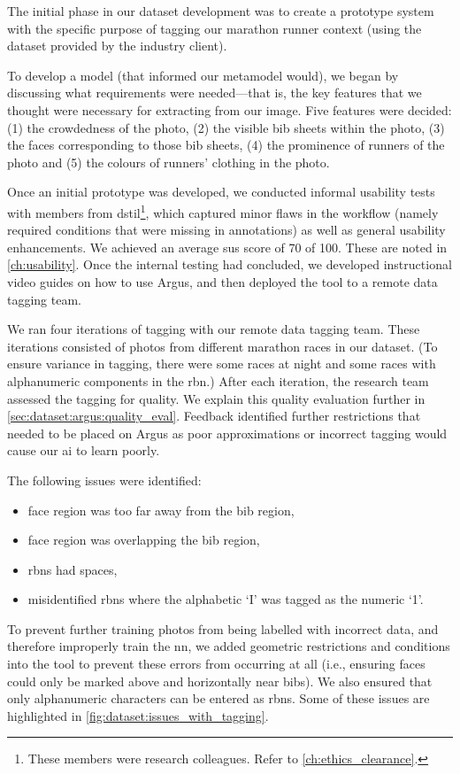 The initial phase in our dataset development was to create a prototype system with the specific purpose of tagging our marathon runner context (using the dataset provided by the industry client).


To develop a model (that informed our metamodel would), we began by discussing what requirements were needed---that is, the key features that we thought were necessary for extracting from our image. Five features were decided: (1) the crowdedness of the photo, (2) the visible bib sheets within the photo, (3) the faces corresponding to those bib sheets, (4) the prominence of runners of the photo and (5) the colours of runners' clothing in the photo.

Once an initial prototype was developed, we conducted informal usability tests with members from \gls{dstil}\footnote{These members were research colleagues. Refer to \cref{ch:ethics_clearance}.}, which captured minor flaws in the workflow (namely required conditions that were missing in annotations) as well as general usability enhancements. We achieved an average \gls{sus} score \citep{Jordan:1996wa} of 70 of 100. These are noted in \cref{ch:usability}. Once the internal testing had concluded, we developed instructional video guides on how to use Argus, and then deployed the tool to a remote data tagging team.

We ran four iterations of tagging with our remote data tagging team. These iterations consisted of photos from different marathon races in our dataset. (To ensure variance in tagging, there were some races at night and some races with alphanumeric components in the \gls{rbn}.) After each iteration, the research team assessed the tagging for quality. We explain this quality evaluation further in \cref{sec:dataset:argus:quality_eval}. Feedback identified further restrictions that needed to be placed on Argus as poor approximations or incorrect tagging would cause our \gls{ai} to learn poorly. 

The following issues were identified:

\begin{itemize}
  \item face region was too far away from the bib region,
  \item face region was overlapping the bib region,
  \item \glspl{rbn} had spaces,
  \item misidentified \glspl{rbn} where the alphabetic `I' was tagged as the numeric `1'.
\end{itemize}
\noindent
To prevent further training photos from being labelled with incorrect data, and therefore improperly train the \gls{nn},  we added geometric restrictions and conditions into the tool to prevent these errors from occurring at all (i.e., ensuring faces could only be marked above and horizontally near bibs). We also ensured that only alphanumeric characters can be entered as \glspl{rbn}. Some of these issues are highlighted in \cref{fig:dataset:issues_with_tagging}.

